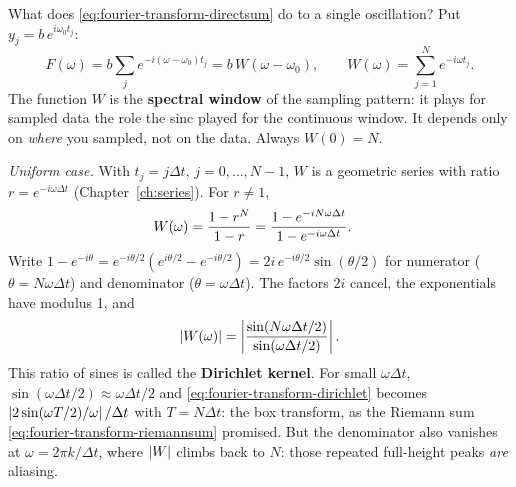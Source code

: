 What does \eqref{eq:fourier-transform-directsum} do to a single oscillation? Put $y_j=b\,e^{i\omega_0t_j}$:
\begin{equation}
F(\omega)=b\sum_{j}e^{-i(\omega-\omega_0)t_j}=b\,W(\omega-\omega_0),\qquad W(\omega)=\sum_{j=1}^{N}e^{-i\omega t_j}.
\label{eq:fourier-transform-specwin}
\end{equation}
The function $W$ is the \textbf{spectral window} of the sampling pattern: it plays for sampled data the role the sinc played for the continuous window. It depends only on \emph{where} you sampled, not on the data. Always $W(0)=N$.

\emph{Uniform case.} With $t_j=j\Delta t$, $j=0,\dots,N-1$, $W$ is a geometric series with ratio $r=e^{-i\omega\Delta t}$ (Chapter~\ref{ch:series}). For $r\ne1$,
\begin{align}
W(\omega)&=\frac{1-r^N}{1-r}=\frac{1-e^{-iN\omega\Delta t}}{1-e^{-i\omega\Delta t}}.\notag
\end{align}
Write $1-e^{-i\theta}=e^{-i\theta/2}(e^{i\theta/2}-e^{-i\theta/2})=2i\,e^{-i\theta/2}\sin(\theta/2)$ for numerator ($\theta=N\omega\Delta t$) and denominator ($\theta=\omega\Delta t$). The factors $2i$ cancel, the exponentials have modulus 1, and
\begin{equation}
\left\lvert W(\omega)\right\rvert=\left|\frac{\sin(N\omega\Delta t/2)}{\sin(\omega\Delta t/2)}\right| .
\label{eq:fourier-transform-dirichlet}
\end{equation}
This ratio of sines is called the \textbf{Dirichlet kernel}. For small $\omega\Delta t$, $\sin(\omega\Delta t/2)\approx\omega\Delta t/2$ and \eqref{eq:fourier-transform-dirichlet} becomes $\left\lvert 2\sin(\omega T/2)/\omega\right\rvert/\Delta t$ with $T=N\Delta t$: the box transform, as the Riemann sum \eqref{eq:fourier-transform-riemannsum} promised. But the denominator also vanishes at $\omega=2\pi k/\Delta t$, where $\left\lvert W\right\rvert$ climbs back to $N$: those repeated full-height peaks \emph{are} aliasing.

